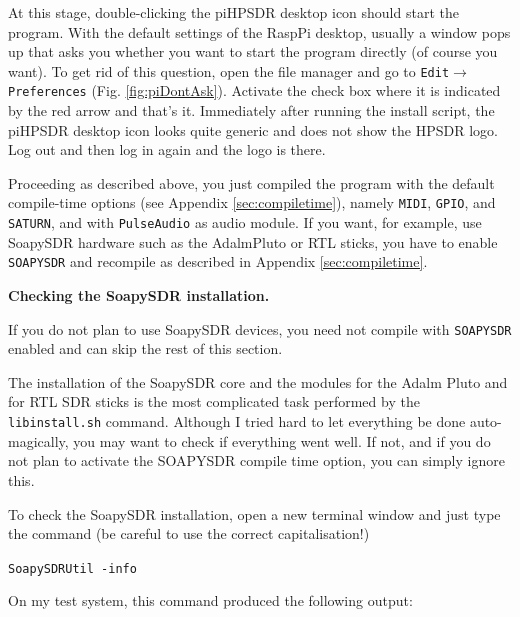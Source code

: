 \documentclass[12pt]{book}
\def\grtt#1{\texttt{\color{magenta}#1}}
\def\pH{pi\-HPSDR\xspace}
\begin{document}
At this stage, double-clicking the \pH desktop icon should start the program.
With the default settings of the RaspPi desktop, usually a window pops up that
asks you whether you want to start the program directly (of course you want).
To get rid of this question, open the file manager
and go to
\texttt{Edit}$\to$\texttt{Preferences} (Fig. \ref{fig:piDontAsk}). Activate the check
box where it is indicated by the red arrow and that's it.
Immediately after running the install script, the \pH desktop icon
looks quite generic and does not show the HPSDR logo. Log out and then log in again
and the logo is there.

Proceeding as described above,  you  just compiled the program with
the default compile-time options (see Appendix \ref{sec:compiletime}), namely
\texttt{MIDI}, \texttt{GPIO}, and \texttt{SATURN}, and with \texttt{PulseAudio}
as audio module. If you want, for example, use SoapySDR hardware such as the AdalmPluto
or RTL sticks, you have to enable \texttt{SOAPYSDR} and recompile as described in
Appendix \ref{sec:compiletime}.


\textbf{Checking the SoapySDR installation.}

If you do not plan to use SoapySDR devices, you need not compile with \texttt{SOAPYSDR}
enabled and can skip the rest of this section.

The installation of the SoapySDR core and the modules for the Adalm Pluto and for RTL SDR
sticks is the most complicated task performed by the \texttt{libinstall.sh} command.
Although I tried hard to let everything be done auto-magically, you may want to check
if everything went well. If not, and if you do not plan to activate the SOAPYSDR compile time
option, you can simply ignore this.

\clearpage
To check the SoapySDR installation, open a new terminal
window and just type the command (be careful to use the correct capitalisation!)

\grtt{SoapySDRUtil -info}

On my test system, this command produced the following output:
\end{document}
